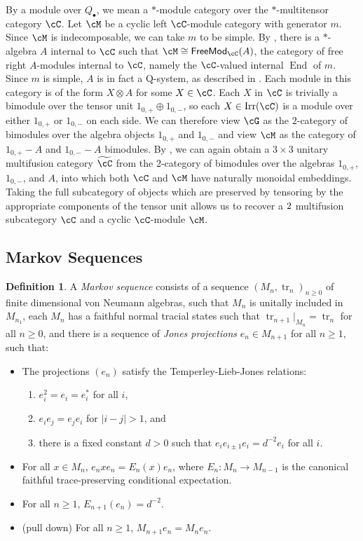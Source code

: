 \documentclass[11pt]{article}
\theoremstyle{plain}
\theoremstyle{definition}
\newtheorem{defn}[thm]{Definition}
\DeclareMathOperator{\End}{End}
\DeclareMathOperator{\Irr}{Irr}
\DeclareMathOperator{\tr}{tr}
\newcommand{\FreeMod}{{\sf FreeMod}}
\begin{document}
By a module over $Q_\bullet$, we mean a $\ast$-module category over the $\ast$-multitensor category $\cC$. Let $\cM$ be a cyclic left $\cC$-module category with generator $m$. 
Since $\cM$ is indecomposable, we can take $m$ to be simple. 
By \cite{ostrik03}, there is a $\ast$-algebra $A$ internal to $\cC$ such that $\cM\cong\FreeMod_\cC(A)$, the category of free right $A$-modules internal to $\cC$, namely the $\cC$-valued internal $\End$ of $m$. 
Since $m$ is simple, 
$A$ is in fact a Q-system, %
as described in \cite[Rmk.2.7]{ny17}.  
Each module in this category is of the form $X\otimes A$ for some $X\in\cC$. 
Each $X$ in $\cC$ is trivially a bimodule over the tensor unit $1_{0,+}\oplus1_{0,-}$, so each $X\in\Irr(\cC)$ is a module over either $1_{0,+}$ or $1_{0,-}$ on each side. 
We can therefore view $\cG$ as the $2$-category of bimodules over the algebra objects $1_{0,+}$ and $1_{0,-}$ and view $\cM$ as the category of $1_{0,+}-A$ and $1_{0,-}-A$ bimodules. 
By \cite[Thm.4.1]{ny17}, we can again obtain a $3\times 3$ unitary multifusion category $\widetilde{\cC}$ from the $2$-category of bimodules over the algebras $1_{0,+}$, $1_{0,-}$, and $A$, into which both $\cC$ and $\cM$ have naturally monoidal embeddings. 
Taking the full subcategory of objects which are preserved by tensoring by the appropriate components of the tensor unit allows us to recover a $2\time 2$ multifusion subcategory $\cC$ and a cyclic $\cC$-module $\cM$. 



\subsection{Markov Sequences}


\begin{defn}
A \emph{Markov sequence} consists of a sequence $(M_n, \tr_n)_{n\geq 0}$ of finite dimensional von Neumann algebras, such that $M_n$ is unitally included in $M_{n_1}$, each $M_n$ has a faithful normal tracial states such that $\tr_{n+1}|_{M_n} = \tr_n$ for all $n\geq 0$, and there is a sequence of \emph{Jones projections} $e_n \in M_{n+1}$ for all $n\geq 1$, such that:
\begin{itemize}
\item
The projections $(e_n)$ satisfy the Temperley-Lieb-Jones relations:
\begin{enumerate}[(1)]
\item
$e_i^2 = e_i = e_i^*$ for all $i$,
\item
$e_i e_j = e_j e_i$ for $|i-j|>1$, and
\item
there is a fixed constant $d>0$ such that $e_{i} e_{i\pm 1} e_i = d^{-2} e_i$ for all $i$.
\end{enumerate}
\item
For all $x\in M_n$, $e_n x e_n = E_n(x)e_n$, where $E_n: M_n \to M_{n-1}$ is the canonical faithful trace-preserving conditional expectation.
\item
For all $n\geq 1$, $E_{n+1}(e_n) = d^{-2}$.
\item
(pull down)
For all $n\geq 1$, $M_{n+1}e_n = M_n e_n$.

\end{itemize}
\end{defn}
\end{document}
